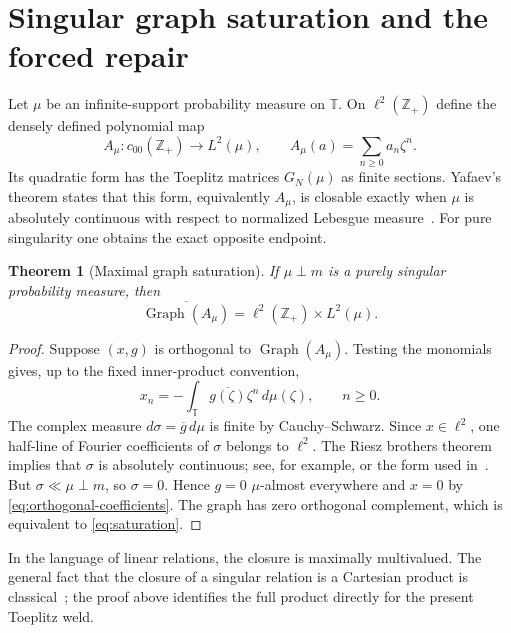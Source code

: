 \documentclass[11pt]{article}
\newtheorem{theorem}{Theorem}[section]
\newcommand{\T}{\mathbb T}
\newcommand{\Graph}{\operatorname{Graph}}
\begin{document}
\section{Singular graph saturation and the forced repair}\label{sec:graph}

Let $\mu$ be an infinite-support probability measure on $\T$.  On
$\ell^2(\mathbb Z_+)$ define the densely defined polynomial map
\begin{equation}\label{eq:raw-map}
  A_\mu:c_{00}(\mathbb Z_+)\longrightarrow L^2(\mu),
  \qquad A_\mu(a)=\sum_{n\geq0}a_n\zeta^n.
\end{equation}
Its quadratic form has the Toeplitz matrices $G_N(\mu)$ as finite sections.  Yafaev's theorem
states that this form, equivalently $A_\mu$, is closable exactly when
$\mu$ is absolutely continuous with respect to normalized Lebesgue measure~\cite{Yafaev2016}.
For pure singularity one obtains the exact opposite endpoint.

\begin{theorem}[Maximal graph saturation]\label{thm:saturation}
If $\mu\perp m$ is a purely singular probability measure, then
\begin{equation}\label{eq:saturation}
  \overline{\Graph(A_\mu)}
  =\ell^2(\mathbb Z_+)\times L^2(\mu).
\end{equation}
\end{theorem}

\begin{proof}
Suppose $(x,g)$ is orthogonal to $\Graph(A_\mu)$.  Testing the monomials gives, up to the fixed
inner-product convention,
\begin{equation}\label{eq:orthogonal-coefficients}
  x_n=-\int_{\T}\overline{g(\zeta)}\zeta^n\,d\mu(\zeta),
  \qquad n\geq0.
\end{equation}
The complex measure $d\sigma=\overline g\,d\mu$ is finite by Cauchy--Schwarz.  Since
$x\in\ell^2$, one half-line of Fourier coefficients of $\sigma$ belongs to $\ell^2$.
The Riesz brothers theorem implies that $\sigma$ is absolutely continuous; see, for example,
\cite[Chapter~4]{Duren1970} or the form used in~\cite[Theorem~2.6]{Yafaev2016}.  But
$\sigma\ll\mu\perp m$, so $\sigma=0$.  Hence $g=0$ $\mu$-almost everywhere and
$x=0$ by \eqref{eq:orthogonal-coefficients}.  The graph has zero orthogonal complement, which is
equivalent to \eqref{eq:saturation}.
\end{proof}

In the language of linear relations, the closure is maximally multivalued.  The general fact that
the closure of a singular relation is a Cartesian product is classical~\cite{HassiEtAl2007}; the
proof above identifies the full product directly for the present Toeplitz weld.
\end{document}
